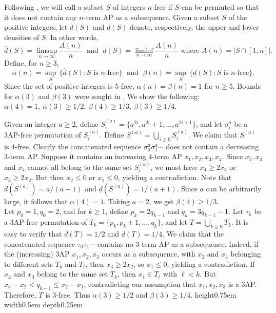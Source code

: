 \documentclass[12pt]{article}
\newcommand{\eop}{\nobreak \ifvmode \relax \else
\ifdim\lastskip<1.5em \hskip-\lastskip
\hskip1.5em plus0em minus0.5em \fi \nobreak
\vrule height0.75em width0.5em depth0.25em\fi}
\begin{document}
Following \cite{Sha09}, we will call a subset $S$ of integers $n$-free if 
$S$ can be permuted so that it does not contain any $n$-term AP as a 
subsequence. Given a subset $S$ of the positive integers, let 
$\overline{d}(S)$ and $\underline{d}(S)$ denote, respectively, the upper 
and lower densities of $S$. In other words, $$\overline{d}(S) = \limsup_{n 
\rightarrow \infty} \frac{A(n)}{n} \; \mbox{ and } \; \underline{d}(S) = 
\liminf_{n \rightarrow \infty} \frac{A(n)}{n} \mbox{ where } A(n)=|S \cap
[1,n]|. $$ Define, for $n \ge 3$, $$\alpha(n)= \sup_S \, 
\{\overline{d}(S): S \mbox{ is $n$-free} \} \; \mbox{ and } \; \beta(n)= 
\sup_S \, \{\underline{d}(S): S \mbox{ is $n$-free} \}. $$ Since the set 
of positive integers is $5$-free, $\alpha(n)=\beta(n)=1$ for $n \ge 5$. 
Bounds for $\alpha(3)$ and $\beta(3)$ were sought in \cite{Dav77}. We 
show the following: \\

\theorem $\alpha(4)=1, \: \alpha(3) \ge 1/2, \: \beta(4) \ge 1/3, 
\: \beta(3) \ge 1/4$. 

\proof Given an integer $a \ge 2$, define $S^{(a)}_i = 
\{a^{2i},a^{2i}+1,\ldots, a^{2i+1}\}$, and let $\sigma^a_i$ be a 
3AP-free permutation of $S^{(a)}_i$. Define $S^{(a)} = \bigcup_{i \ge 0} 
S^{(a)}_i$. We claim that $S^{(a)}$ is $4$-free. Clearly the concatenated 
sequence $\sigma^a_0 \sigma^a_1 \cdots$ does not contain a decreasing 
$3$-term AP. Suppose it contains an increasing $4$-term AP $x_1, x_2, x_3, 
x_4$. Since $x_2, x_3$ and $x_4$ cannot all belong to the same set 
$S^{(a)}_i$, we must have $x_4 \ge 2x_3$ or $x_3 \ge 2x_2$. But then $x_2 
\le 0$ or $x_1 \le 0$, yielding a contradiction. Note that 
$\overline{d}(S^{(a)})=a/(a+1)$ and $\underline{d}(S^{(a)})=1/(a+1)$.  
Since $a$ can be arbitrarily large, it follows that $\alpha(4)=1$. Taking 
$a=2$, we get $\beta(4) \ge 1/3$. \\

Let $p_0=1,q_0=2$, and for $k \ge 1$, define $p_k=2q_{k-1}$ and 
$q_k=3q_{k-1}-1$. Let $\tau_k$ be a 3AP-free permutation of 
$T_k=\{p_k,p_k+1,\ldots,q_k\}$, and let $T=\bigcup_{k \ge 0} T_k$. It is 
easy to verify that $\overline{d}(T)=1/2$ and $\underline{d}(T)=1/4$. We 
claim that the concatenated sequence $\tau_0 \tau_1 \cdots$ contains no 
$3$-term AP as a subsequence. Indeed, if the (increasing) 3AP $x_1, x_2, 
x_3$ occurs as a subsequence, with $x_2$ and $x_3$ belonging to different 
sets $T_k$ and $T_{\ell}$, then $x_3 \ge 2x_2$, so $x_1 \le 0$, yielding a 
contradiction. If $x_2$ and $x_3$ belong to the same set $T_k$, then $x_1 
\in T_{\ell}$ with $\ell < k$. But $x_3 - x_2 < q_{k-1} \le x_2 - x_1$,
contradicting our assumption that $x_1, x_2, x_3$ is a 3AP. Therefore, $T$ 
is $3$-free. Thus $\alpha(3) \ge 1/2$ and $\beta(3) \ge 1/4$. \eop \\
\end{document}

